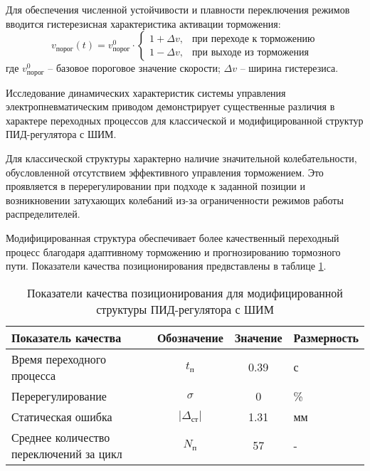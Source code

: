 Для обеспечения численной устойчивости и плавности переключения режимов вводится гистерезисная характеристика активации торможения:
\begin{equation*}\label{eq:hysteresis}
	v_{\text{порог}}(t) = v_{\text{порог}}^0 \cdot \begin{cases}
		1 + \Delta v, & \text{при переходе к торможению} \\
		1 - \Delta v, & \text{при выходе из торможения}
	\end{cases}
\end{equation*}
где $v_{\text{порог}}^0$ -- базовое пороговое значение скорости;
$\Delta v$ -- ширина гистерезиса.

Исследование динамических характеристик системы управления электропневматическим приводом демонстрирует существенные различия
в характере переходных процессов для классической и модифицированной структур ПИД-регулятора с ШИМ.

Для классической структуры характерно наличие значительной колебательности, обусловленной отсутствием эффективного
управления торможением. Это проявляется в перерегулировании при подходе к заданной позиции и возникновении
затухающих колебаний из-за ограниченности режимов работы распределителей.

Модифицированная структура обеспечивает более качественный переходный процесс благодаря
адаптивному торможению и прогнозированию тормозного пути. Показатели качества позиционирования
предвставлены в таблице \ref{tab:system_params_pid}.

\begin{table}[h!]
	\centering
	\caption{Показатели качества позиционирования для модифицированной структуры ПИД-регулятора с ШИМ}
	\small
	\begin{tabular}{lccl}
		\textbf{Показатель качества}            & \textbf{Обозначение}   & \textbf{Значение} & \textbf{Размерность} \\
		\midrule
		Время переходного процесса              & $t_п$                  & \num{0.39}        & с                    \\
		Перерегулирование                       & $\sigma$               & \num{0}           & \%                   \\
		Статическая ошибка                      & $|\Delta_{\text{ст}}|$ & \num{1.31}        & мм                   \\
		Среднее количество переключений за цикл & $N_\text{п}$           & 57                & -                    \\
		\midrule
	\end{tabular}
	\label{tab:system_params_pid}
\end{table}


